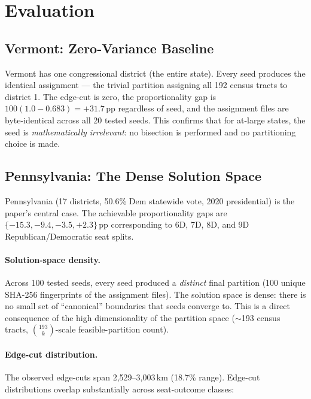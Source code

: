 \section{Evaluation}
\label{sec:evaluation}

\subsection{Vermont: Zero-Variance Baseline}
\label{sec:eval:vt}

Vermont has one congressional district (the entire state). Every seed produces
the identical assignment --- the trivial partition assigning all 192 census
tracts to district 1. The edge-cut is zero, the proportionality gap is
$100(1.0 - 0.683) = +31.7$\,pp regardless of seed, and the assignment files
are byte-identical across all 20 tested seeds. This confirms that for
at-large states, the seed is \emph{mathematically irrelevant}: no bisection
is performed and no partitioning choice is made.

\subsection{Pennsylvania: The Dense Solution Space}
\label{sec:eval:pa}

Pennsylvania (17 districts, 50.6\% Dem statewide vote, 2020 presidential)
is the paper's central case. The achievable proportionality gaps are
$\{-15.3, -9.4, -3.5, +2.3\}$\,pp corresponding to 6D, 7D, 8D, and 9D
Republican/Democratic seat splits.

\paragraph{Solution-space density.}
Across 100 tested seeds, every seed produced a \emph{distinct} final
partition (100 unique SHA-256 fingerprints of the assignment files). The
solution space is dense: there is no small set of ``canonical'' boundaries
that seeds converge to. This is a direct consequence of the high dimensionality
of the partition space ($\sim$193 census tracts, $\binom{193}{k}$-scale
feasible-partition count).

\paragraph{Edge-cut distribution.}
The observed edge-cuts span 2{,}529--3{,}003\,km (18.7\% range). Edge-cut
distributions overlap substantially across seat-outcome classes:

